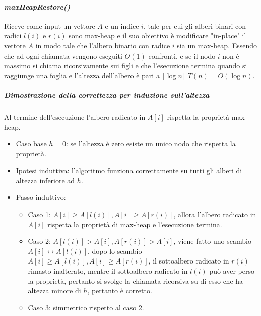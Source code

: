 \paragraph{\emph{maxHeapRestore()}}
Riceve come input un vettore $A$ e un indice $i$, tale per cui gli alberi binari con radici $l(i)$ e $r(i)$ sono max-heap e il suo obiettivo \`e modificare
"in-place" il vettore $A$ in modo tale che l'albero binario con radice $i$ sia un max-heap. Essendo che ad ogni chiamata vengono eseguiti $O(1)$ confronti, 
e se il nodo $i$ non \`e massimo si chiama ricorsivamente sui figli e che l'esecuzione termina quando si raggiunge una foglia e l'altezza dell'albero \`e
pari a $\lfloor \log n\rfloor$ $T(n)=O(\log n)$.

\subparagraph{Dimostrazione della correttezza per induzione sull'altezza}
Al termine dell'esecuzione l'albero radicato in $A[i]$ rispetta la propriet\`a max-heap.
\begin{itemize}
\item Caso base $h=0$: se l'altezza \`e zero esiste un unico nodo che rispetta la propriet\`a.
\item Ipotesi induttiva: l'algoritmo funziona correttamente su tutti gli alberi di altezza inferiore ad $h$.
\item Passo induttivo:
\begin{itemize}
\item Caso 1: $A[i]\ge A[l(i)], A[i]\ge A[r(i)]$, allora l'albero radicato in $A[i]$ rispetta la propriet\`a di max-heap e l'esecuzione termina.
\item Caso 2: $A[l(i)] > A[i], A[r(i)]> A[i]$, viene fatto uno scambio $A[i]\leftrightarrow A[l(i)]$, dopo lo scambio $A[i]\ge A[l(i)], A[i]\ge A[r(i)]$, 
il sottoalbero radicato in $r(i)$ rimasto inalterato,  mentre il sottoalbero radicato in $l(i)$ pu\`o aver perso la propriet\`a, pertanto si svolge la 
chiamata ricorsiva su di esso che ha altezza minore di $h$, pertanto \`e corretto.
\item Caso 3: simmetrico rispetto al caso 2.
\end{itemize}
\end{itemize}
